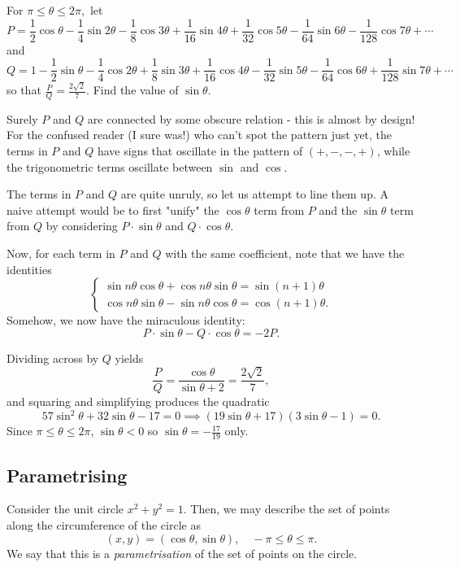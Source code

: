 \documentclass[../main.tex]{subfiles}
\begin{document}
\begin{example}[2013 AIME I/14]
    For $\pi\leq\theta\leq2\pi,$ let
    $$P=\frac{1}{2}\cos{\theta}-\frac{1}{4}\sin{2\theta}-\frac{1}{8}\cos{3\theta}+\frac{1}{16}\sin{4\theta}+\frac{1}{32}\cos{5\theta}-\frac{1}{64}\sin{6\theta}-\frac{1}{128}\cos{7\theta}+\cdots$$
    and
    $$Q=1-\frac{1}{2}\sin{\theta}-\frac{1}{4}\cos{2\theta}+\frac{1}{8}\sin{3\theta}+\frac{1}{16}\cos{4\theta}-\frac{1}{32}\sin{5\theta}-\frac{1}{64}\cos{6\theta}+\frac{1}{128}\sin{7\theta}+\cdots$$
    so that $\frac{P}{Q}=\frac{2\sqrt{2}}{7}.$ Find the value of $\sin{\theta}$.
\end{example}
Surely $P$ and $Q$ are connected by some obscure relation - this is almost by design! For the confused reader (I sure was!) who can't spot the pattern just yet, the terms in $P$ and $Q$ have signs that oscillate in the pattern of $(+,-,-,+)$, while the trigonometric terms oscillate between $\sin$ and $\cos$.

The terms in $P$ and $Q$ are quite unruly, so let us attempt to line them up. A naive attempt would be to first "unify" the $\cos{\theta}$ term from $P$ and the $\sin{\theta}$ term from $Q$ by considering $P\cdot\sin{\theta}$ and $Q\cdot\cos{\theta}$.

Now, for each term in $P$ and $Q$ with the same coefficient, note that we have the identities
$$\begin{cases}
    \sin{n\theta}\cos{\theta}+\cos{n\theta}\sin{\theta}=\sin{(n+1)\theta} \\
    \cos{n\theta}\sin{\theta}-\sin{n\theta}\cos{\theta}=\cos{(n+1)\theta}.
\end{cases}$$
Somehow, we now have the miraculous identity:
$$P\cdot\sin{\theta}-Q\cdot\cos{\theta}=-2P.$$

Dividing across by $Q$ yields $$\frac{P}{Q}=\frac{\cos{\theta}}{\sin{\theta}+2}=\frac{2\sqrt{2}}{7},$$
and squaring and simplifying produces the quadratic
$$57\sin^2{\theta}+32\sin{\theta}-17=0 \implies (19\sin{\theta}+17)(3\sin{\theta}-1)=0.$$
Since $\pi\leq\theta\leq2\pi$, $\sin{\theta}<0$ so $\sin{\theta}=\boxed{-\frac{17}{19}}$ only.
\subsection{Parametrising \med}
Consider the unit circle $x^2+y^2=1$. Then, we may describe the set of points along the circumference of the circle as
$$(x,y)=(\cos\theta, \sin\theta), \quad -\pi\leq\theta\leq\pi.$$
We say that this is a \textit{parametrisation} of the set of points on the circle.
\end{document}
